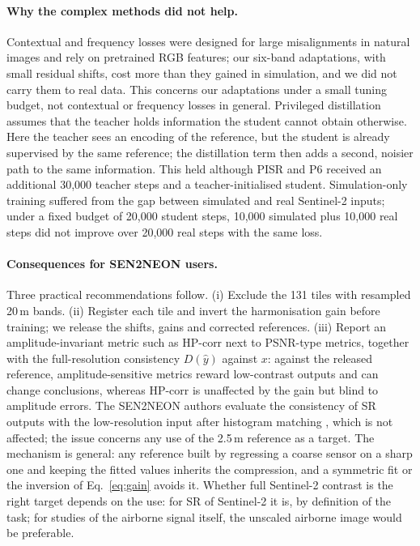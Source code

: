 \documentclass[pdflatex,sn-basic,referee,lineno]{sn-jnl}
\begin{document}
\paragraph{Why the complex methods did not help.} Contextual and frequency losses were designed for large
misalignments in natural images and rely on pretrained RGB features; our six-band adaptations, with small residual
shifts, cost more than they gained in simulation, and we did not carry them to real data. This concerns our
adaptations under a small tuning budget, not contextual or frequency losses in general. Privileged distillation assumes that the teacher holds information the student cannot obtain
otherwise. Here the teacher sees an encoding of the reference, but the student is already supervised by the same
reference; the distillation term then adds a second, noisier path to the same information. This held although PISR
and P6 received an additional 30,000 teacher steps and a teacher-initialised student. Simulation-only training
suffered from the gap between simulated and real Sentinel-2 inputs; under a fixed budget of 20,000 student steps,
10,000 simulated plus 10,000 real steps did not improve over 20,000 real steps with the same loss.

\paragraph{Consequences for SEN2NEON users.} Three practical recommendations follow. (i) Exclude the 131 tiles with
resampled 20\,m bands. (ii) Register each tile and invert the harmonisation gain before training; we release the
shifts, gains and corrected references. (iii) Report an amplitude-invariant metric such as HP-corr next to
PSNR-type metrics, together with the full-resolution consistency $D(\hat y)$ against $x$: against the released
reference, amplitude-sensitive metrics reward low-contrast outputs and can change conclusions, whereas HP-corr is
unaffected by the gain but blind to amplitude errors. The SEN2NEON authors evaluate the consistency of SR
outputs with the low-resolution input after histogram matching \citep{donike2026sen2neon}, which is not affected;
the issue concerns any use of the 2.5\,m reference as a target. The mechanism is general: any reference built by
regressing a coarse sensor on a sharp one and keeping the fitted values inherits the compression, and a symmetric
fit or the inversion of Eq.~\eqref{eq:gain} avoids it. Whether full Sentinel-2 contrast is the right target depends
on the use: for SR of Sentinel-2 it is, by definition of the task; for studies of the airborne signal itself, the
unscaled airborne image would be preferable.
\end{document}
